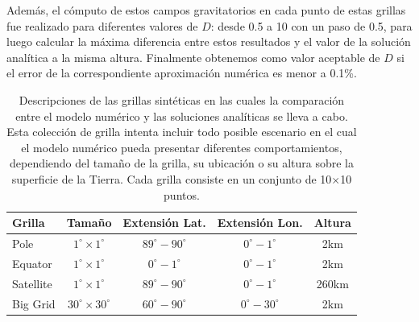 \documentclass[a4paper,10pt]{article}
\begin{document}
Además, el cómputo de estos campos gravitatorios en cada punto de estas grillas fue realizado para diferentes valores de $D$: desde 0.5 a 10 con un paso de 0.5, para luego calcular la máxima diferencia entre estos resultados y el valor de la solución analítica a la misma altura.
Finalmente obtenemos como valor aceptable de $D$ si el error de la correspondiente aproximación numérica es menor a 0.1\%.

\begin{table}
\centering
\caption{
    Descripciones de las grillas sintéticas en las cuales la comparación entre el modelo numérico y las soluciones analíticas se lleva a cabo. Esta colección de grilla intenta incluir todo posible escenario en el cual el modelo numérico pueda presentar diferentes comportamientos, dependiendo del tamaño de la grilla, su ubicación o su altura sobre la superficie de la Tierra. Cada grilla consiste en un conjunto de 10$\times$10 puntos.
}
\label{tab:grids}
\begin{tabular}{lcccc}
    Grilla & Tamaño & Extensión Lat. & Extensión Lon. & Altura \\ \hline
    Pole & $1^\circ \times 1^\circ$ & $89^\circ - 90^\circ$ & $0^\circ - 1^\circ$ & 2km \\
    Equator & $1^\circ \times 1^\circ$ & $0^\circ - 1^\circ$ & $0^\circ - 1^\circ$ & 2km \\
    Satellite & $1^\circ \times 1^\circ$ & $89^\circ - 90^\circ$ & $0^\circ - 1^\circ$ & 260km \\
    Big Grid & $30^\circ \times 30^\circ$ & $60^\circ - 90^\circ$ & $0^\circ - 30^\circ$ & 2km \\
\end{tabular}
\end{table}
\end{document}
